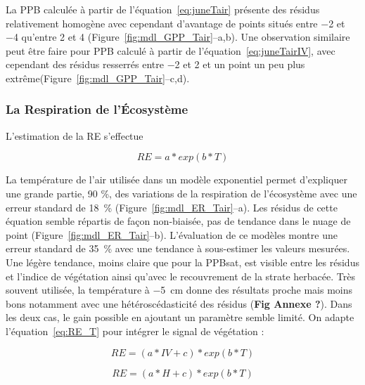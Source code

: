 
La PPB calculée à partir de l'équation~\ref{eq:juneTair} présente des résidus relativement homogène avec cependant d'avantage de points situés entre \num{-2} et \num{-4} qu'entre \num{2} et \num{4} (Figure~\ref{fig:mdl_GPP_Tair}--a,b).
Une observation similaire peut être faire pour PPB calculé à partir de l'équation~\ref{eq:juneTairIV}, avec cependant des résidus resserrés entre \num{-2} et \num{2} et un point un peu plus extrême(Figure~\ref{fig:mdl_GPP_Tair}--c,d).

\subsubsection{La Respiration de l'Écosystème}



L'estimation de la RE s'effectue

\begin{equation} \label{eq:RE_T}
RE = a*exp(b*T)
\end{equation}

La température de l'air utilisée dans un modèle exponentiel permet d'expliquer une grande partie, 90 \%, des variations de la respiration de l'écosystème avec une erreur standard de \SI{18}{\percent} (Figure~\ref{fig:mdl_ER_Tair}--a).
Les résidus de cette équation semble répartis de façon non-biaisée, pas de tendance dans le nuage de point (Figure~\ref{fig:mdl_ER_Tair}--b).
L'évaluation de ce modèles montre une erreur standard de \SI{35}{\percent} avec une tendance à sous-estimer les valeurs mesurées.
Une légère tendance, moins claire que pour la PPBsat, est visible entre les résidus et l'indice de végétation ainsi qu'avec le recouvrement de la strate herbacée.
Très souvent utilisée, la température à \SI{-5}{\centi\metre} donne des résultats proche mais moins bons notamment avec une hétéroscédasticité des résidus (\textbf{Fig Annexe ?}).
Dans les deux cas, le gain possible en ajoutant un paramètre semble limité.
On adapte l'équation~\ref{eq:RE_T} pour intégrer le signal de végétation :

\begin{equation} \label{eq:RE_TIV}
RE = (a*IV + c)*exp(b*T)
\end{equation}

\begin{equation} \label{eq:RE_TH}
RE = (a*H + c)*exp(b*T)
\end{equation}

